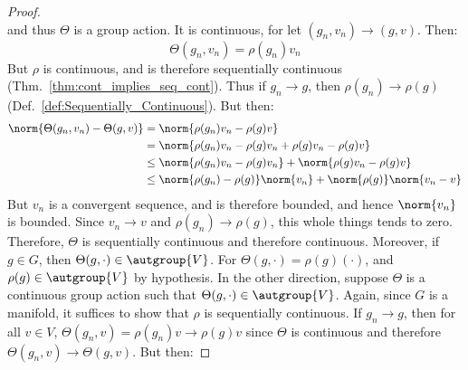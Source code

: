 \documentclass{article}                                                        %
\begin{document}
\begin{proof}
\begin{subequations}
                \end{subequations}
                and thus $\Theta$ is a group action. It is continuous, for let
                $(g_{n},v_{n})\rightarrow(g,v)$. Then:
                \begin{equation}
                    \Theta(g_{n},v_{n})=\rho(g_{n})v_{n}
                \end{equation}
                But $\rho$ is continuous, and is therefore sequentially continuous
                (Thm.~\ref{thm:cont_implies_seq_cont}). Thus if
                $g_{n}\rightarrow{g}$, then $\rho(g_{n})\rightarrow\rho(g)$
                (Def.~\ref{def:Sequentially_Continuous}). But then:
                \begin{subequations}
                    \begin{align}
                        \norm{\Theta(g_{n},v_{n})-\Theta(g,v)}
                        &=\norm{\rho(g_{n})v_{n}-\rho(g)v}\\
                        &=\norm{\rho(g_{n})v_{n}-\rho(g)v_{n}
                            +\rho(g)v_{n}-\rho(g)v}\\
                        &\leq\norm{\rho(g_{n})v_{n}-\rho(g)v_{n}}+
                            \norm{\rho(g)v_{n}-\rho(g)v}\\
                        &\leq\norm{\rho(g_{n})-\rho(g)}\norm{v_{n}}
                            +\norm{\rho(g)}\norm{v_{n}-v}
                    \end{align}
                \end{subequations}
                But $v_{n}$ is a convergent sequence, and is therefore bounded, and
                hence $\norm{v_{n}}$ is bounded. Since $v_{n}\rightarrow{v}$ and
                $\rho(g_{n})\rightarrow\rho(g)$, this whole things tends to zero.
                Therefore, $\Theta$ is sequentially continuous and therefore
                continuous. Moreover, if $g\in{G}$, then
                $\Theta(g,\cdot)\in\autgroup{V}$. For
                $\Theta(g,\cdot)=\rho(g)(\cdot)$, and $\rho(g)\in\autgroup{V}$ by
                hypothesis. In the other direction, suppose $\Theta$ is a continuous
                group action such that $\Theta(g,\cdot)\in\autgroup{V}$. Again,
                since $G$ is a manifold, it suffices to show that $\rho$ is
                sequentially continuous. If $g_{n}\rightarrow{g}$, then for all
                $v\in{V}$, $\Theta(g_{n},v)=\rho(g_{n})v\rightarrow\rho(g)v$ since
                $\Theta$ is continuous and therefore
                $\Theta(g_{n},v)\rightarrow\Theta(g,v)$. But then:

\end{proof}
\end{document}
